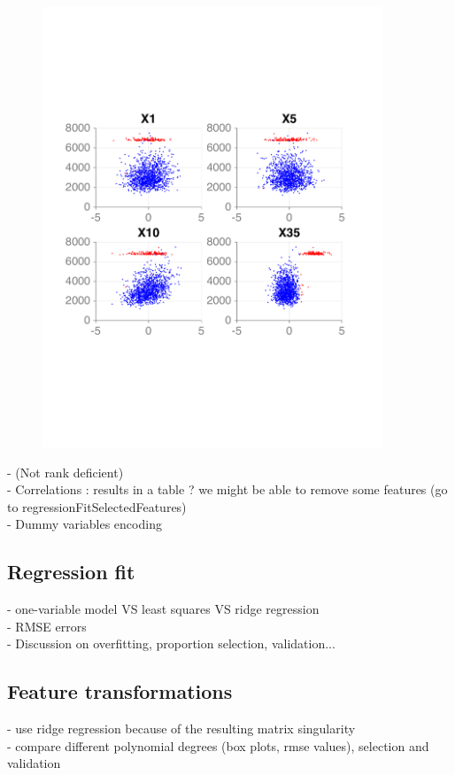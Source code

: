 \documentclass{article} %
\begin{document}
\begin{figure}[!t]
{    \includegraphics[width=4in]{figures/regression/model-separation-rough.pdf}
    \label{fig:twoModelsRough}
  }
  \caption{}
  \end{figure}

  - (Not rank deficient)\\
  - Correlations : results in a table ? we might be able to remove some features (go to regressionFitSelectedFeatures)\\
  - Dummy variables encoding

  \subsection{Regression fit}
  - one-variable model VS least squares VS ridge regression\\
  - RMSE errors\\
  - Discussion on overfitting, proportion selection, validation...

  \subsection{Feature transformations}
  - use ridge regression because of the resulting matrix singularity\\
  - compare different polynomial degrees (box plots, rmse values), selection and validation
\end{document}
